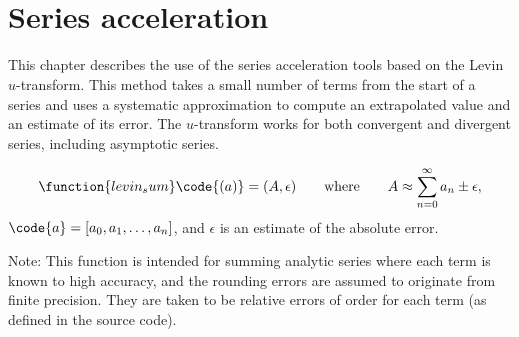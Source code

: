 \chapter[\protect\module{pygsl.sum} --- Series acceleration]{
  \protect{} \\ Series acceleration}
\label{cha:sum-module}


This chapter describes the use of the series acceleration tools based
on the Levin $u$-transform.  This method takes a small number of terms
from the start of a series and uses a systematic approximation to
compute an extrapolated value and an estimate of its error. The
$u$-transform works for both convergent and divergent series,
including asymptotic series.

\begin{equation}
  \label{eq:levin}
  \function{levin_sum}\code{(a)} = (A, \epsilon)
  \qquad\text{where}
  \qquad
  A \approx \sum_{n=0}^{\infty} a_{n} \pm \epsilon, 
\end{equation}
$\code{a} = [a_{0}, a_{1}, \ldots, a_{n}]$, and $\epsilon$ is an
estimate of the absolute error.

Note: This function is intended for summing analytic series where each
term is known to high accuracy, and the rounding errors are assumed to
originate from finite precision. They are taken to be relative errors
of order  for each term (as defined in the
\GSL{} source code).

